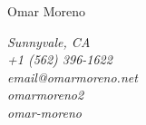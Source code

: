 \documentclass[11pt]{article}
\begin{document}
    \noindent
    \begin{minipage}[c]{0.5\textwidth}
        \begin{flushleft}
            \Huge{Omar Moreno}
        \end{flushleft}
    \end{minipage}
    \begin{minipage}[c]{0.50\textwidth}
        \begin{flushright}
            \color{dimgray} \em
            Sunnyvale, CA           \\
            +1 (562) 396-1622       \\
            email@omarmoreno.net    \\
            omarmoreno2             \\
            omar-moreno             \\
        \end{flushright}
    \end{minipage}
\end{document}
